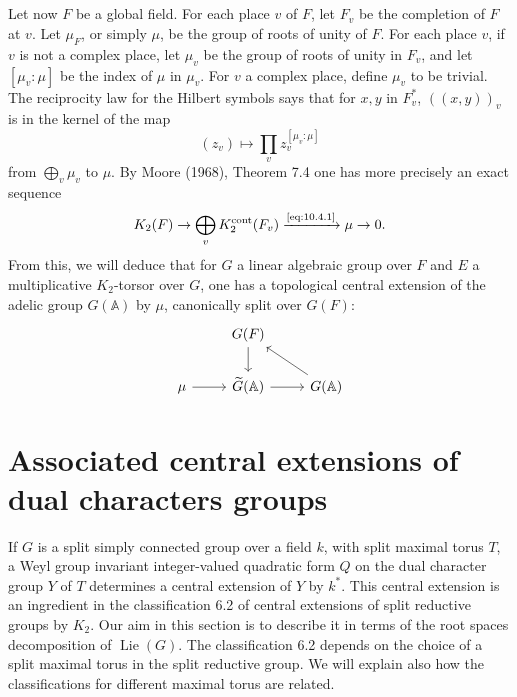 \documentclass[11pt,a4paper]{article}
\theoremstyle{plain}
\theoremstyle{definition}
\DeclareMathOperator{\Lie}{Lie}
\DeclareMathOperator{\cont}{cont}
\newcommand{\bA}{\mathbb{A}}
\begin{document}
\subsection{}
Let now $F$ be a global field. For each place $v$ of $F$, let $F_v$ be the completion of $F$ at $v$. Let $\mu_F$, or simply $\mu$, be the group of roots of unity of $F$. For each place $v$, if $v$ is not a complex place, let $\mu_v$ be the group of roots of unity in $F_v$, and let $[\mu_v : \mu]$ be the index of $\mu$ in $\mu_v$. For $v$ a complex place, define $\mu_v$ to be trivial. The reciprocity law for the Hilbert symbols says that for $x, y$ in $F_v^*$, $((x,y))_v$ is in the kernel of the map
\begin{equation}\label{eq:10.4.1}
(z_v) \mapsto \prod_v z_v^{[\mu_v : \mu]}
\end{equation}
from $\bigoplus_v \mu_v$ to $\mu$. By Moore (1968), Theorem 7.4 one has more precisely an exact sequence
\begin{equation}\label{eq:10.4.2}
K_2(F) \to \bigoplus_v K_2^{\cont}(F_v) \xrightarrow{\text{\eqref{eq:10.4.1}}} \mu \to 0.
\end{equation}
From this, we will deduce that for $G$ a linear algebraic group over $F$ and $E$ a multiplicative $K_2$-torsor over $G$, one has a topological central extension of the adelic group $G(\bA)$ by $\mu$, canonically split over $G(F)$:
\begin{equation}\label{eq:10.4.3}
\begin{tikzcd}
& G(F) \arrow[d] \\
\mu \arrow[r] & \widetilde{G}(\bA) \arrow[r] & G(\bA) \arrow[lu]
\end{tikzcd}
\end{equation}

\section{Associated central extensions of dual characters groups}

If $G$ is a split simply connected group over a field $k$, with split maximal torus $T$, a Weyl group invariant integer-valued quadratic form $Q$ on the dual character group $Y$ of $T$ determines a central extension of $Y$ by $k^*$. This central extension is an ingredient in the classification 6.2 of central extensions of split reductive groups by $K_2$. Our aim in this section is to describe it in terms of the root spaces decomposition of $\Lie(G)$. The classification 6.2 depends on the choice of a split maximal torus in the split reductive group. We will explain also how the classifications for different maximal torus are related.
\end{document}
